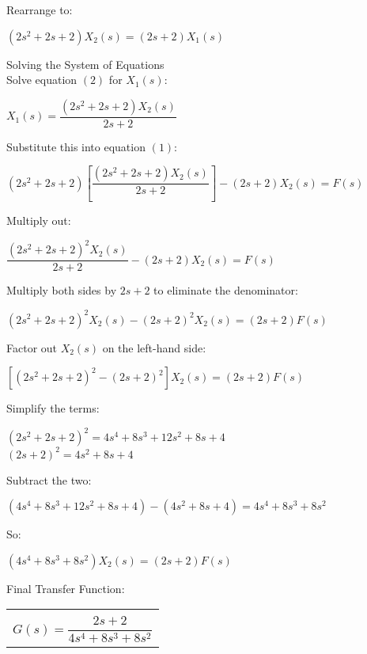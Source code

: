 \documentclass[11pt,letterpaper]{article}
\begin{document}
Rearrange to:\\
\begin{center}
	$(2s^2+2s+2)X_2(s)=(2s+2)X_1(s)$\\
\end{center}
Solving the System of Equations\\[12pt]
Solve equation $(2)$ for $X_1(s)$:\\
\begin{center}
	$X_1(s)=\dfrac{(2s^2+2s+2)X_2(s)}{2s+2}$\\
\end{center}
Substitute this into equation $(1)$:\\
\begin{center}
	$(2s^2+2s+2)\left[\dfrac{(2s^2+2s+2)X_2(s)}{2s+2}\right]-(2s+2)X_2(s)=F(s)$\\
\end{center}
Multiply out:\\
\begin{center}
	$\dfrac{(2s^2+2s+2)^2X_2(s)}{2s+2}-(2s+2)X_2(s)=F(s)$\\
\end{center}
Multiply both sides by $2s + 2$ to eliminate the denominator:\\
\begin{center}
	$(2s^2+2s+2)^2X_2(s)-(2s+2)^2X_2(s)=(2s+2)F(s)$\\
\end{center}
Factor out $X_2(s)$ on the left-hand side:\\
\begin{center}
	$[(2s^2+2s+2)^2-(2s+2)^2]X_2(s)=(2s+2)F(s)$\\
\end{center}
Simplify the terms:\\
\begin{center}
	$(2s^2+2s+2)^2=4s^4+8s^3+12s^2+8s+4$\\[12pt]
	$(2s+2)^2=4s^2+8s+4$\\
\end{center}
Subtract the two:\\
\begin{center}
	$(4s^4+8s^3+12s^2+8s+4)-(4s^2+8s+4)=4s^4+8s^3+8s^2$\\
\end{center}
So:\\
\begin{center}
	$(4s^4+8s^3+8s^2)X_2(s)=(2s+2)F(s)$\\
\end{center}
Final Transfer Function:\\
\begin{center}
	\begin{tabular}{|c|}
		\hline \\
		$G(s)=\dfrac{2s+2}{4s^4+8s^3+8s^2}$	\\ [12pt]
	\hline
	\end{tabular}	
\end{center}
\end{document}
